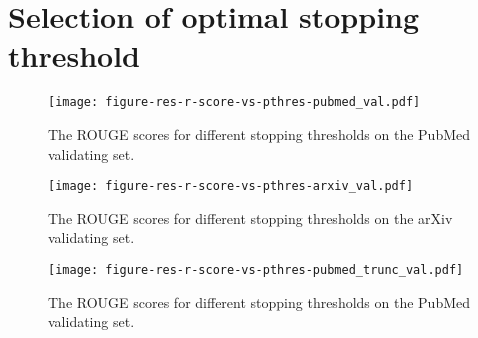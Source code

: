 \documentclass[11pt]{article}
\begin{document}
\begin{table}
\centering
{}
\caption{ \label{tab:extraction_time_analysis} Average extractive summarization time of  MemSum on different datasets.}
\end{table}


\section{Selection of optimal stopping threshold}
\label{sec:selection_of_optimal}
\begin{figure}[ht]
\centering
  \texttt{[image: figure-res-r-score-vs-pthres-pubmed\_val.pdf]}
  \caption{The ROUGE scores for different stopping thresholds  on the PubMed validating set.}
  \label{fig:pthres_pubmed}
\end{figure}

\begin{figure}[ht]
\centering
  \texttt{[image: figure-res-r-score-vs-pthres-arxiv\_val.pdf]}
  \caption{The ROUGE scores for different stopping thresholds  on the arXiv validating set.}
  \label{fig:pthres_arxiv}
\end{figure}
\begin{figure}[ht]
\centering
  \texttt{[image: figure-res-r-score-vs-pthres-pubmed\_trunc\_val.pdf]}
  \caption{The ROUGE scores for different stopping thresholds  on the PubMed validating set.}
  \label{fig:pthres_pubmed_trunc}
\end{figure}
\end{document}

